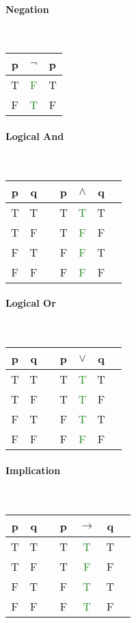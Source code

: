 \documentclass[a4paper, 10pt]{article}
\begin{document}
\begin{multicols}{3}
\paragraph{Negation}\mbox{}\\
\begin{tabular}{@{ }c | c@{ }@{ }c}
p & \( \neg \) & p\\
\hline
T & \textcolor{ForestGreen}{F} & T\\
F & \textcolor{ForestGreen}{T} & F\\
\end{tabular}
\paragraph{Logical And}\mbox{}\\
\begin{tabular}{@{ }c@{ }@{ }c | c@{ }@{ }c@{ }@{ }c@{ }@{ }c@{ }@{ }c}
p & q &  & p & \( \land\) & q & \\
\hline
T & T &  & T & \textcolor{ForestGreen}{T} & T & \\
T & F &  & T & \textcolor{ForestGreen}{F} & F & \\
F & T &  & F & \textcolor{ForestGreen}{F} & T & \\
F & F &  & F & \textcolor{ForestGreen}{F} & F & \\
\end{tabular}
\paragraph{Logical Or}\mbox{}\\
\begin{tabular}{@{ }c@{ }@{ }c | c@{ }@{ }c@{ }@{ }c@{ }@{ }c@{ }@{ }c}
p & q &  & p & \( \lor \) & q & \\
\hline
T & T &  & T & \textcolor{ForestGreen}{T} & T & \\
T & F &  & T & \textcolor{ForestGreen}{T} & F & \\
F & T &  & F & \textcolor{ForestGreen}{T} & T & \\
F & F &  & F & \textcolor{ForestGreen}{F} & F & \\
\end{tabular}
\paragraph{Implication}\mbox{}\\
\begin{tabular}{@{ }c@{ }@{ }c | c@{ }@{ }c@{ }@{ }c@{ }@{ }c@{ }@{ }c}
p & q &  & p & \(\rightarrow\) & q & \\
\hline
T & T &  & T & \textcolor{ForestGreen}{T} & T & \\
T & F &  & T & \textcolor{ForestGreen}{F} & F & \\
F & T &  & F & \textcolor{ForestGreen}{T} & T & \\
F & F &  & F & \textcolor{ForestGreen}{T} & F & \\
\end{tabular}

\end{multicols}
\end{document}
